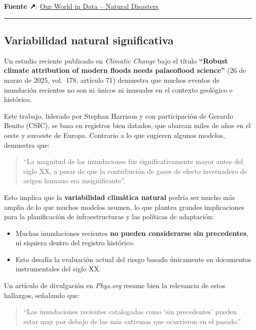 \documentclass[
  10pt,
  a4paper,
  DIV=11,
  numbers=noendperiod,
  open=any]{scrreprt}
\providecommand{\tightlist}{%
  \setlength{\itemsep}{0pt}\setlength{\parskip}{0pt}}
\numberwithin{equation}{chapter}
\numberwithin{equation}{section}
\renewcommand{\[}{\begin{equation}}
\renewcommand{\]}{\end{equation}}
\begin{document}
\textbf{Fuente ↗}:
\href{https://ourworldindata.org/natural-disasters}{Our World in Data --
Natural Disasters}

\begin{center}\rule{0.5\linewidth}{0.5pt}\end{center}

\subsection{Variabilidad natural
significativa}\label{variabilidad-natural-significativa}

Un estudio reciente publicado en \emph{Climatic Change} bajo el título
\textbf{``Robust climate attribution of modern floods needs palaeoflood
science''} (26 de marzo de 2025, vol.~178, artículo 71) demuestra que
muchos eventos de inundación recientes no son ni únicos ni inusuales en
el contexto geológico e histórico.

Este trabajo, liderado por Stephan Harrison y con participación de
Gerardo Benito (CSIC), se basa en registros bien datados, que abarcan
miles de años en el oeste y suroeste de Europa. Contrario a lo que
sugieren algunos modelos, demuestra que:

\begin{quote}
``La magnitud de las inundaciones fue significativamente mayor antes del
siglo XX, a pesar de que la contribución de gases de efecto invernadero
de origen humano era insignificante''.
\end{quote}

Esto implica que la \textbf{variabilidad climática natural} podría ser
mucho más amplia de lo que muchos modelos asumen, lo que plantea grandes
implicaciones para la planificación de infraestructuras y las políticas
de adaptación:

\begin{itemize}
\tightlist
\item
  Muchas inundaciones recientes \textbf{no pueden considerarse sin
  precedentes}, ni siquiera dentro del registro histórico.
\item
  Esto desafía la evaluación actual del riesgo basado únicamente en
  documentos instrumentales del siglo XX.
\end{itemize}

Un artículo de divulgación en \emph{Phys.org} resume bien la relevancia
de estos hallazgos, señalando que:

\begin{quote}
``Las inundaciones recientes catalogadas como `sin precedentes' pueden
estar muy por debajo de las más extremas que ocurrieron en el pasado.''
\end{quote}
\end{document}
